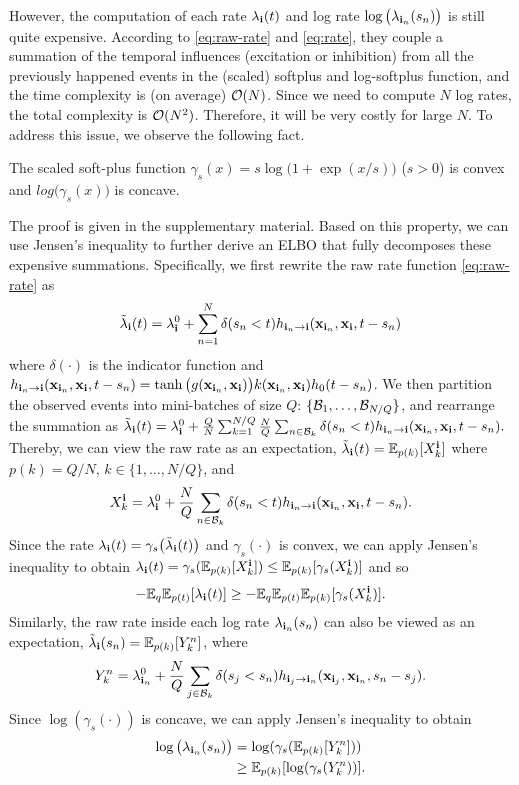 However, the computation of each rate $\lambda_{\bf i}(t)$ and log rate $\log\big(\lambda_{{\bf i}_n}(s_n)\big)$ is still quite expensive. According to \eqref{eq:raw-rate} and \eqref{eq:rate}, they couple  a summation of the temporal influences (excitation or inhibition) from all the previously happened events in the (scaled) softplus and log-softplus function, and the time complexity is (on average) $\mathcal{O}(N)$. Since we need to compute $N$ log rates, the total complexity is $\mathcal{O}(N^2)$. Therefore, it will be very costly for large $N$. To address this issue, we observe the following fact. 
\begin{lem}
	The scaled soft-plus function $\gamma_s(x) = s\log\big(1+\exp({x}/{s})\big)$ ($s>0$) is convex and $log\big(\gamma_s(x)\big)$ is concave. 
\end{lem}\label{lem:1}
The proof is given in the supplementary material. Based on this property, we can use Jensen's inequality to further derive an ELBO that fully decomposes these expensive summations. Specifically, we first rewrite the raw rate function \eqref{eq:raw-rate} as 
\[
{\tilde{\lambda}}_{{\bf i}}(t) = \lambda_{\bf i}^0 + \sum_{n=1}^N \delta(s_n<t)h_{{\bf i}_n \rightarrow {\bf i}}({\bf x}_{{\bf i}_n}, {\bf x}_{{\bf i}}, t-s_n)
\]
where $\delta(\cdot)$ is the indicator function and $h_{{\bf i}_n \rightarrow {\bf i}}({\bf x}_{{\bf i}_n}, {\bf x}_{{\bf i}}, t - s_n) = \tanh\big(g({\bf x}_{{\bf i}_n}, {\bf x}_{{\bf i}})\big)k({\bf x}_{{\bf i}_n}, {\bf x}_{{\bf i}})h_0(t-s_n)$. We then partition the observed events into mini-batches of size $Q$: $\{\mathcal{B}_1, \ldots, \mathcal{B}_{N/Q}\}$, and rearrange the summation as  $
{\tilde{\lambda}}_{{\bf i}}(t) = \lambda_{\bf i}^0 + \frac{Q}{N}\sum_{k=1}^{N/Q}\frac{N}{Q} \sum_{n \in \mathcal{B}_k} \delta(s_n<t)h_{{\bf i}_n \rightarrow {\bf i}}({\bf x}_{{\bf i}_n}, {\bf x}_{{\bf i}}, t-s_n).$
Thereby, we can view the raw rate as an expectation, ${\tilde{\lambda}}_{{\bf i}}(t) = \mathbb{E}_{p(k)}[X_k^{\bf i}]$ where $p(k) = Q/N$, $k \in \{1, \ldots, N/Q\}$, and 
\[
X_k^{\bf i} =  \lambda_{\bf i}^0 + \frac{N}{Q} \sum_{n \in \mathcal{B}_k} \delta(s_n<t)h_{{\bf i}_n \rightarrow {\bf i}}({\bf x}_{{\bf i}_n}, {\bf x}_{{\bf i}}, t-s_n).
\]
Since the rate $\lambda_{\bf i}(t) = \gamma_s\big({\tilde{\lambda}}_{{\bf i}}(t)\big) $ and $\gamma_s(\cdot)$ is convex, we can apply Jensen's inequality to obtain $\lambda_{\bf i}(t)  = \gamma_s(\mathbb{E}_{p(k)}[X_k^{\bf i}]) \le \mathbb{E}_{p(k)}[\gamma_s(X_k^{\bf i})]$
 and so
\begin{align}
-\mathbb{E}_{q}\mathbb{E}_{p(t)}[\lambda_{\bf i}(t)] \ge -\mathbb{E}_{q}\mathbb{E}_{p(t)}\mathbb{E}_{p(k)}[\gamma_s(X_k^{\bf i})]. \label{eq:bound1}
\end{align}
Similarly, the raw rate inside each log rate $\lambda_{{\bf i}_n}(s_n)$ can also be viewed as an expectation, ${\tilde{\lambda}}_{{\bf i}}(s_n) = \mathbb{E}_{p(k)}[Y_k^n]$, where  
\[
Y_k^n =  \lambda_{{\bf i}_n}^0 + \frac{N}{Q} \sum_{j \in \mathcal{B}_k} \delta(s_j<s_n)h_{{\bf i}_j \rightarrow {\bf i}_n}({\bf x}_{{\bf i}_j}, {\bf x}_{{\bf i}_n}, s_n-s_j).
\]
Since $\log(\gamma_s(\cdot))$ is concave, we can apply Jensen's inequality to obtain
\begin{align}
 \log\big(\lambda_{{\bf i}_n}(s_n)\big)  &= \log(\gamma_s(\mathbb{E}_{p(k)}[Y_k^n])) \notag \\
 &\ge \mathbb{E}_{p(k)}[\log(\gamma_s(Y_k^n))]. \label{eq:bound2}
\end{align}

